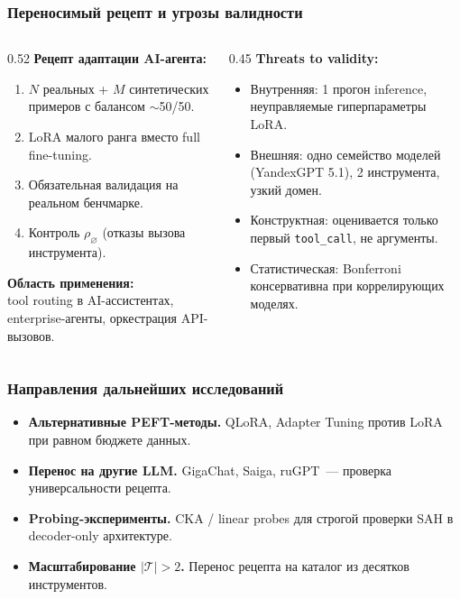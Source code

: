 \documentclass[aspectratio=169]{beamer}
\begin{document}
\begin{frame}
\frametitle{Переносимый рецепт и угрозы валидности}
\begin{columns}[T]
\begin{column}{0.52\textwidth}
\textbf{Рецепт адаптации AI-агента:}
\begin{enumerate}
  \item $N$ реальных + $M$ синтетических примеров с балансом $\sim$50/50.
  \item LoRA малого ранга вместо full fine-tuning.
  \item Обязательная валидация на реальном бенчмарке.
  \item Контроль $\rho_\varnothing$ (отказы вызова инструмента).
\end{enumerate}

\smallskip
\textbf{Область применения:}\\
tool routing в AI-ассистентах, enterprise-агенты, оркестрация API-вызовов.
\end{column}
\begin{column}{0.45\textwidth}
\textbf{Threats to validity:}
\begin{itemize}
  \item Внутренняя: 1 прогон inference, неуправляемые гиперпараметры LoRA.
  \item Внешняя: одно семейство моделей (YandexGPT 5.1), 2 инструмента, узкий домен.
  \item Конструктная: оценивается только первый \texttt{tool\_call}, не аргументы.
  \item Статистическая: Bonferroni консервативна при коррелирующих моделях.
\end{itemize}
\end{column}
\end{columns}
\end{frame}

\begin{frame}
\frametitle{Направления дальнейших исследований}
\begin{itemize}
  \item \textbf{Альтернативные PEFT-методы.} QLoRA, Adapter Tuning против LoRA при равном бюджете данных.
  \item \textbf{Перенос на другие LLM.} GigaChat, Saiga, ruGPT~— проверка универсальности рецепта.
  \item \textbf{Probing-эксперименты.} CKA / linear probes для строгой проверки SAH в decoder-only архитектуре.
  \item \textbf{Масштабирование $|\mathcal{T}| > 2$.} Перенос рецепта на каталог из десятков инструментов.
\end{itemize}
\end{frame}
\end{document}
